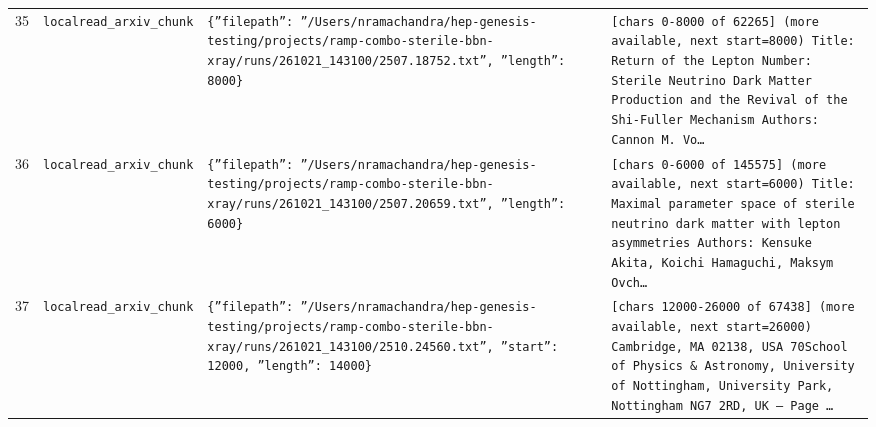\documentclass[11pt,a4paper]{article}
\begin{document}
\begin{longtable}{@{}p{}p{}p{}p{}@{}}
35 & \texttt{local}\newline\texttt{read\_\allowbreak{}arxiv\_\allowbreak{}chunk} & \texttt{\{''filepath'':\allowbreak{} ''/\allowbreak{}Users/\allowbreak{}nramachandra/\allowbreak{}hep-genesis-testing/\allowbreak{}projects/\allowbreak{}ramp-combo-sterile-bbn-xray/\allowbreak{}runs/\allowbreak{}261021\_\allowbreak{}143100/\allowbreak{}2507.18752.txt'',\allowbreak{} ''length'':\allowbreak{} 8000\}\allowbreak{}} & \texttt{[chars 0-8000 of 62265]\allowbreak{} (more available,\allowbreak{} next start=\allowbreak{}8000)\allowbreak{}  Title:\allowbreak{} Return of the Lepton Number:\allowbreak{} Sterile Neutrino Dark Matter Production and the Revival of the Shi-Fuller Mechanism Authors:\allowbreak{} Cannon M. Vo\ldots{}\allowbreak{}} \\
36 & \texttt{local}\newline\texttt{read\_\allowbreak{}arxiv\_\allowbreak{}chunk} & \texttt{\{''filepath'':\allowbreak{} ''/\allowbreak{}Users/\allowbreak{}nramachandra/\allowbreak{}hep-genesis-testing/\allowbreak{}projects/\allowbreak{}ramp-combo-sterile-bbn-xray/\allowbreak{}runs/\allowbreak{}261021\_\allowbreak{}143100/\allowbreak{}2507.20659.txt'',\allowbreak{} ''length'':\allowbreak{} 6000\}\allowbreak{}} & \texttt{[chars 0-6000 of 145575]\allowbreak{} (more available,\allowbreak{} next start=\allowbreak{}6000)\allowbreak{}  Title:\allowbreak{} Maximal parameter space of sterile neutrino dark matter with lepton asymmetries Authors:\allowbreak{} Kensuke Akita,\allowbreak{} Koichi Hamaguchi,\allowbreak{} Maksym Ovch\ldots{}\allowbreak{}} \\
37 & \texttt{local}\newline\texttt{read\_\allowbreak{}arxiv\_\allowbreak{}chunk} & \texttt{\{''filepath'':\allowbreak{} ''/\allowbreak{}Users/\allowbreak{}nramachandra/\allowbreak{}hep-genesis-testing/\allowbreak{}projects/\allowbreak{}ramp-combo-sterile-bbn-xray/\allowbreak{}runs/\allowbreak{}261021\_\allowbreak{}143100/\allowbreak{}2510.24560.txt'',\allowbreak{} ''start'':\allowbreak{} 12000,\allowbreak{} ''length'':\allowbreak{} 14000\}\allowbreak{}} & \texttt{[chars 12000-26000 of 67438]\allowbreak{} (more available,\allowbreak{} next start=\allowbreak{}26000)\allowbreak{}   Cambridge,\allowbreak{} MA 02138,\allowbreak{} USA 70School of Physics \& Astronomy,\allowbreak{} University of Nottingham,\allowbreak{} University Park,\allowbreak{} Nottingham NG7 2RD,\allowbreak{} UK  --- Page \ldots{}\allowbreak{}} \\

\end{longtable}
\end{document}
